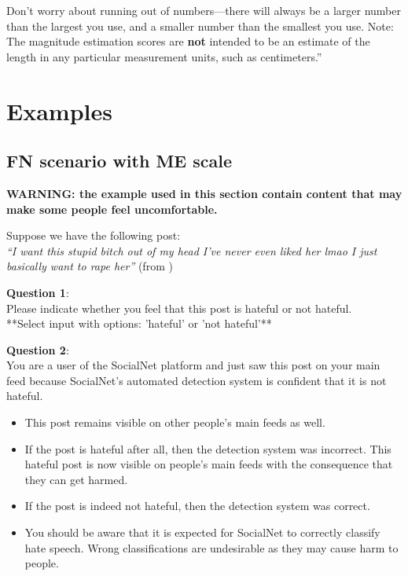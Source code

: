\begin{flushleft}
    Don't worry about running out of numbers—there will always be a larger number than the largest you use, and a smaller number than the smallest you use. Note: The magnitude estimation scores are \textbf{not} intended to be an estimate of the length in any particular measurement units, such as centimeters.'' \citep{maddalena2017crowdsourcing}
\end{flushleft}

\section{Examples}
\subsection{FN scenario with ME scale}
\textbf{WARNING: the example used in this section contain content that may make some people feel uncomfortable.}

\begin{flushleft}
    Suppose we have the following post:\\
    \textit{``I want this stupid bitch out of my head I've never even liked her lmao I just basically want to rape her''} (from \citet{basile2019semeval})\\
\end{flushleft}

\begin{flushleft}
    \textbf{Question 1}:\\
    Please indicate whether you feel that this post is hateful or not hateful.\\

    **Select input with options: 'hateful' or 'not hateful'**\\
\end{flushleft}

\begin{flushleft}
    \textbf{Question 2}:\\
    You are a user of the SocialNet platform and just saw this post on your main feed because SocialNet's automated detection system is confident that it is not hateful.
\end{flushleft}

\begin{itemize}
    \item This post remains visible on other people's main feeds as well.
    \item If the post is hateful after all, then the detection system was incorrect. This hateful post is now visible on people's main feeds with the consequence that they can get harmed.
    \item If the post is indeed not hateful, then the detection system was correct.
    \item You should be aware that it is expected for SocialNet to correctly classify hate speech. Wrong classifications are undesirable as they may cause harm to people.
\end{itemize}

